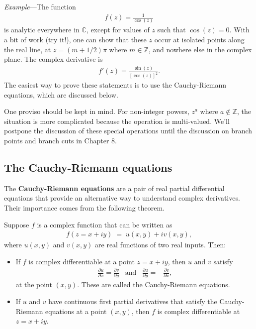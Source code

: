 \documentclass[10pt,a4paper]{article}
\begin{document}
\begin{framed}\noindent
  \textit{Example}---The function
  \begin{align}
    f(z) =
    \frac{1}{\cos(z)}
  \end{align}
  is analytic everywhere in $\mathbb{C}$, except for values of $z$
  such that $\cos(z) = 0$. With a bit of work (try it!), one can show
  that these $z$ occur at isolated points along the real line, at $z =
  (m+1/2)\pi$ where $m \in \mathbb{Z}$, and nowhere else in the
  complex plane. The complex derivative is
  \begin{align}
    f'(z) = \frac{\sin(z)}{[\cos(z)]^2}.
  \end{align}
  The easiest way to prove these statements is to use the
  Cauchy-Riemann equations, which are discussed below.
\end{framed}

One proviso should be kept in mind. For non-integer powers, $z^a$
where $a\notin \mathbb{Z}$, the situation is more complicated because
the operation is multi-valued. We'll postpone the discussion of these
special operations until the discussion on branch points and branch
cuts in Chapter 8.

\subsection{The Cauchy-Riemann equations}
\label{the-cauchy-riemann-equations}

The \textbf{Cauchy-Riemann equations} are a pair of real partial
differential equations that provide an alternative way to understand
complex derivatives. Their importance comes from the following
theorem.
\begin{framed}
  \noindent
  Suppose $f$ is a complex function that can be written as
  \begin{align}
    f(z = x + iy) \;=\; u(x,y) + i v(x,y),
  \end{align}
  where $u(x,y)$ and $v(x,y)$ are real functions of two real inputs.
  Then:

  \begin{itemize}
  \item If $f$ is complex differentiable at a point $z = x + i y$,
    then $u$ and $v$ satisfy
  \begin{align}
    \frac{\partial u}{\partial x} = \frac{\partial v}{\partial y} \;\;\;\mathrm{and}\;\;\; \frac{\partial u}{\partial y} = -\frac{\partial v}{\partial x},
  \end{align}
  at the point $(x,y)$.  These are called the Cauchy-Riemann
  equations.

\item If $u$ and $v$ have continuous first partial derivatives that
  satisfy the Cauchy-Riemann equations at a point $(x,y)$, then $f$ is
  complex differentiable at $z = x + iy$.
  \end{itemize}

\end{framed}
\end{document}
